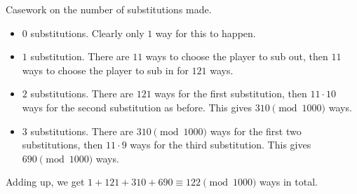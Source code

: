 Casework on the number of substitutions made.
\begin{itemize}
	\item $0$ substitutions. Clearly only $1$ way for this to happen.
	\item $1$ substitution. There are $11$ ways to choose the player to sub out, then $11$ ways to choose the player to sub in for $121$ ways.
	\item $2$ substitutions. There are $121$ ways for the first substitution, then $11\cdot10$ ways for the second substitution as before. This gives $310\pmod{1000}$ ways.
	\item $3$ substitutions. There are $310\pmod{1000}$ ways for the first two substitutions, then $11\cdot9$ ways for the third substitution. This gives $690\pmod{1000}$ ways.
\end{itemize}
Adding up, we get $1+121+310+690\equiv\boxed{122}\pmod{1000}$ ways in total.